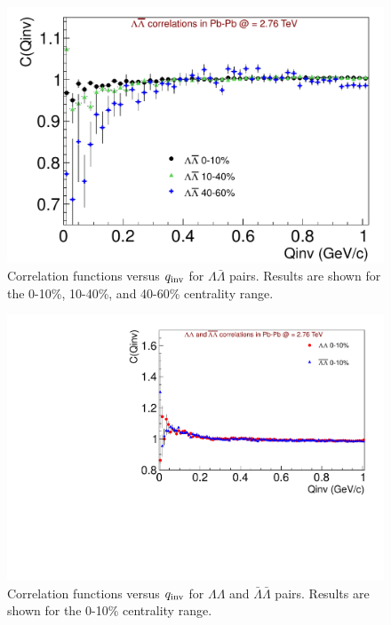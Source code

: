 \begin{figure}[hbtp]
\includegraphics[scale=0.7]{LamALamCF_LooseCuts.pdf}
\caption[Correlation functions versus $q_{\rm inv}$ for $\Lambda\bar{\Lambda}$ pairs in three centrality ranges.]{Correlation functions versus $q_{\rm inv}$ for $\Lambda\bar{\Lambda}$ pairs.  Results are shown for the 0-10\%, 10-40\%, and 40-60\% centrality range.}
\label{fig:CFMixCentralities}
\end{figure}

\begin{figure}[hbtp]
\includegraphics[scale=0.7]{CFs_main_note.pdf}
\caption[Correlation functions versus $q_{\rm inv}$ for $\Lambda\Lambda$ and $\bar{\Lambda}\bar{\Lambda}$ pairs.]{Correlation functions versus $q_{\rm inv}$ for $\Lambda\Lambda$ and $\bar{\Lambda}\bar{\Lambda}$ pairs.  Results are shown for the 0-10\% centrality range.}
\label{fig:CF}
\end{figure}

